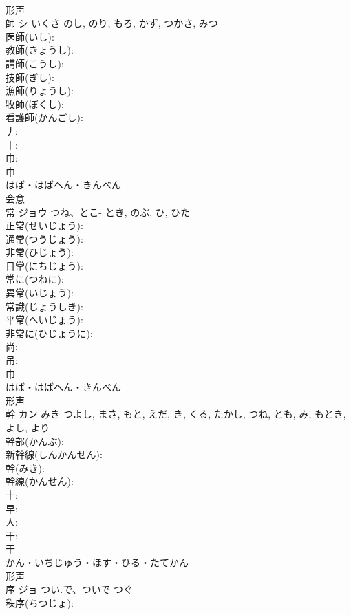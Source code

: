 \documentclass[8pt]{extreport}
\begin{document}
\begin{CJK}{UTF8}{min}
\\	形声 
\\	師	シ	いくさ	のし, のり, もろ, かず, つかさ, みつ	
\\	医師(いし): 
\\	教師(きょうし): 
\\	講師(こうし): 
\\	技師(ぎし): 
\\	漁師(りょうし): 
\\	牧師(ぼくし): 
\\	看護師(かんごし): 
\\	丿: 
\\	丨: 
\\	巾: 
\\	巾	
\\	はば・はばへん・きんべん	
\\	会意 
\\	常	ジョウ	つね、とこ-	とき, のぶ, ひ, ひた	
\\	正常(せいじょう): 
\\	通常(つうじょう): 
\\	非常(ひじょう): 
\\	日常(にちじょう): 
\\	常に(つねに): 
\\	異常(いじょう): 
\\	常識(じょうしき): 
\\	平常(へいじょう): 
\\	非常に(ひじょうに): 
\\	尚: 
\\	吊: 
\\	巾	
\\	はば・はばへん・きんべん	
\\	形声 
\\	幹	カン	みき	つよし, まさ, もと, えだ, き, くる, たかし, つね, とも, み, もとき, よし, より	
\\	幹部(かんぶ): 
\\	新幹線(しんかんせん): 
\\	幹(みき): 
\\	幹線(かんせん): 
\\	十: 
\\	早: 
\\	人: 
\\	干: 
\\	干	
\\	かん・いちじゅう・ほす・ひる・たてかん	
\\	形声 
\\	序	ジョ	つい.で、ついで	つぐ	
\\	秩序(ちつじょ): 

\end{CJK}
\end{document}
